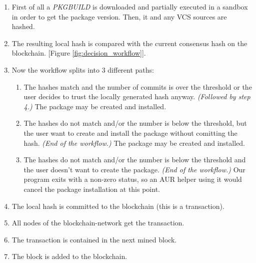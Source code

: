 \begin{enumerate}
	\item First of all a \textit{PKGBUILD} is downloaded and partially executed in a sandbox in order to get the package version. Then, it and any VCS sources are hashed.
	\item The resulting local hash is compared with the current consensus hash on the blockchain. [Figure \ref{fig:decision_workflow}].
	\item Now the workflow splits into 3 different paths:
	\begin{enumerate}
		\item The hashes match and the number of commits is over the threshold or the user decides to trust the locally generated hash anyway. \textit{(Followed by step 4.)} The package may be created and installed.
		\item The hashes do not match and/or the number is below the threshold, but the user want to create and install the package without comitting the hash. \textit{(End of the workflow.)}
		The package may be created and installed.
		\item The hashes do not match and/or the number is below the threshold and the user doesn't want to create the package. \textit{(End of the workflow.)} Our program exits with a non-zero status, so an AUR helper using it would cancel the package installation at this point.
	\end{enumerate}
	\item The local hash is committed to the blockchain (this is a transaction).
	\item All nodes of the blockchain-network get the transaction.
	\item The transaction is contained in the next mined block.
	\item The block is added to the blockchain.
\end{enumerate}
